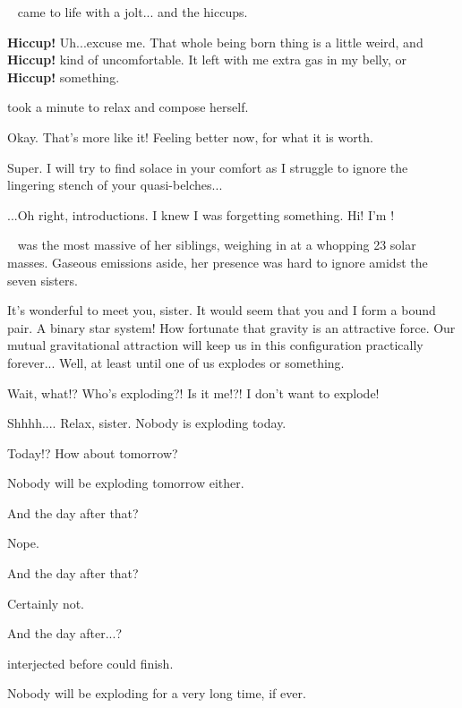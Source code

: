 \documentclass[main.tex]{subfiles}
\begin{document}
\newpara \nar \rmmerope~ came to life with a jolt... and the hiccups.

\newpara \Merope \textbf{Hiccup!}  Uh...excuse me.  That whole being born thing is a little weird, and \textbf{Hiccup!} kind of uncomfortable.  It left with me extra gas in my belly, or \textbf{Hiccup!} something.  

\newpara \nar \rmmerope took a minute to relax and compose herself.

\newpara \Merope Okay.  That's more like it!  Feeling better now, for what it is worth.  

\newpara \Sterope Super.  I will try to find solace in your comfort as I struggle to ignore the lingering stench of your quasi-belches...

\newpara \Merope ...Oh right, introductions. I knew I was forgetting something.   Hi!  I'm \rmmerope!

\newpara \rmmerope~ was the most massive of her siblings, weighing in at a whopping 23 solar masses.  Gaseous emissions aside, her presence was hard to ignore amidst the seven sisters.  

\newpara \Maia It's wonderful to meet you, sister.  It would seem that you and I form a bound pair.  A binary star system!  How fortunate that gravity is an attractive force.  Our mutual gravitational attraction will keep us in this configuration practically forever... Well, at least until one of us explodes or something.

\newpara \Merope Wait, what!?  Who's exploding?!  Is it me!?!  I don't want to explode!

\newpara \Maia Shhhh....  Relax, sister.  Nobody is exploding today.  

\newpara \Merope Today!?  How about tomorrow?  

\newpara \Maia Nobody will be exploding tomorrow either.

\newpara \Merope And the day after that?

\newpara \Maia Nope.

\newpara \Merope And the day after that?

\newpara \Maia Certainly not.

\newpara \Merope And the day after...?

\newpara \nar \rmmaia interjected before \rmmerope could finish.

\newpara \Maia Nobody will be exploding for a very long time, if ever.
\end{document}
